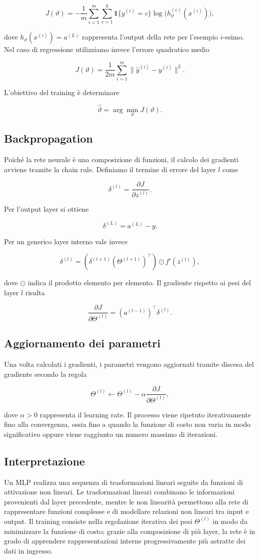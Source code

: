 \[
J(\vartheta) = -\frac{1}{m} \sum_{i=1}^{m} \sum_{c=1}^{k} \mathbf{1}\{y^{(i)} = c\} \log\big(h_\vartheta^{(c)}(x^{(i)})\big),
\]

dove $h_\vartheta(x^{(i)}) = a^{(L)}$ rappresenta l’output della rete per l’esempio $i$-esimo. Nel caso di regressione utilizziamo invece l’errore quadratico medio

\[
J(\vartheta) = \frac{1}{2m} \sum_{i=1}^{m} \|\hat{y}^{(i)} - y^{(i)}\|^2.
\]

L’obiettivo del training è determinare

\[
\hat{\vartheta} = \arg\min_{\vartheta} J(\vartheta).
\]

\subsection{Backpropagation}
Poiché la rete neurale è una composizione di funzioni, il calcolo dei gradienti avviene tramite la chain rule. Definiamo il termine di errore del layer $l$ come

\[
\delta^{(l)} = \frac{\partial J}{\partial z^{(l)}}.
\]

Per l’output layer si ottiene

\[
\delta^{(L)} = a^{(L)} - y.
\]

Per un generico layer interno vale invece

\[
\delta^{(l)} = \left( \delta^{(l+1)} (\Theta^{(l+1)})^\top \right) \odot f'(z^{(l)}),
\]

dove $\odot$ indica il prodotto elemento per elemento. Il gradiente rispetto ai pesi del layer $l$ risulta

\[
\frac{\partial J}{\partial \Theta^{(l)}} = (a^{(l-1)})^\top \delta^{(l)}.
\]

\subsection{Aggiornamento dei parametri}
Una volta calcolati i gradienti, i parametri vengono aggiornati tramite discesa del gradiente secondo la regola

\[
\Theta^{(l)} \leftarrow \Theta^{(l)} - \alpha \frac{\partial J}{\partial \Theta^{(l)}},
\]

dove $\alpha > 0$ rappresenta il learning rate. Il processo viene ripetuto iterativamente fino alla convergenza, ossia fino a quando la funzione di costo non varia in modo significativo oppure viene raggiunto un numero massimo di iterazioni.

\subsection*{Interpretazione}
Un MLP realizza una sequenza di trasformazioni lineari seguite da funzioni di attivazione non lineari. Le trasformazioni lineari combinano le informazioni provenienti dal layer precedente, mentre le non linearità permettono alla rete di rappresentare funzioni complesse e di modellare relazioni non lineari tra input e output. Il training consiste nella regolazione iterativa dei pesi $\Theta^{(l)}$ in modo da minimizzare la funzione di costo; grazie alla composizione di più layer, la rete è in grado di apprendere rappresentazioni interne progressivamente più astratte dei dati in ingresso.

